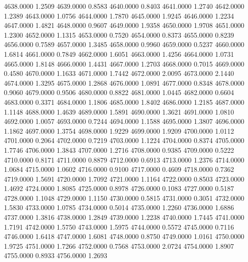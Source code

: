 4638.0000      1.2509
4639.0000      0.8583
4640.0000      0.8403
4641.0000      1.2740
4642.0000      1.2389
4643.0000      1.0756
4644.0000      1.7870
4645.0000      1.9245
4646.0000      1.2234
4647.0000      1.4821
4648.0000      0.9607
4649.0000      1.9358
4650.0000      1.9708
4651.0000      1.2300
4652.0000      1.1315
4653.0000      0.7520
4654.0000      0.8373
4655.0000      0.8239
4656.0000      0.7589
4657.0000      1.3485
4658.0000      0.9960
4659.0000      0.5237
4660.0000      1.6814
4661.0000      0.7849
4662.0000      1.6051
4663.0000      1.4256
4664.0000      1.0731
4665.0000      1.8148
4666.0000      1.4431
4667.0000      1.2703
4668.0000      0.7015
4669.0000      0.4580
4670.0000      1.1633
4671.0000      1.7442
4672.0000      2.0095
4673.0000      2.1440
4674.0000      1.3295
4675.0000      1.2868
4676.0000      1.0891
4677.0000      0.8348
4678.0000      0.9060
4679.0000      0.9506
4680.0000      0.8822
4681.0000      1.0445
4682.0000      0.6604
4683.0000      0.3371
4684.0000      1.1806
4685.0000      1.8402
4686.0000      1.2185
4687.0000      1.1148
4688.0000      1.4639
4689.0000      1.5891
4690.0000      1.3621
4691.0000      1.0810
4692.0000      1.0057
4693.0000      0.7244
4694.0000      1.1588
4695.0000      1.3807
4696.0000      1.1862
4697.0000      1.3754
4698.0000      1.9229
4699.0000      1.9209
4700.0000      1.0112
4701.0000      0.2064
4702.0000      0.7219
4703.0000      1.1224
4704.0000      0.8374
4705.0000      1.7746
4706.0000      1.3843
4707.0000      1.2716
4708.0000      0.9385
4709.0000      0.5222
4710.0000      0.8171
4711.0000      0.8879
4712.0000      0.6913
4713.0000      1.2376
4714.0000      1.0684
4715.0000      1.0602
4716.0000      0.9100
4717.0000      0.4609
4718.0000      0.7362
4719.0000      1.5691
4720.0000      1.7092
4721.0000      1.1164
4722.0000      0.8503
4723.0000      1.4692
4724.0000      1.8085
4725.0000      0.8978
4726.0000      0.1083
4727.0000      0.5187
4728.0000      1.1048
4729.0000      1.1150
4730.0000      0.5815
4731.0000      0.3051
4732.0000      1.5830
4733.0000      1.0785
4734.0000      0.5014
4735.0000      1.2260
4736.0000      1.6886
4737.0000      1.3816
4738.0000      1.2849
4739.0000      1.2238
4740.0000      1.7445
4741.0000      1.7191
4742.0000      1.5750
4743.0000      1.5975
4744.0000      0.5572
4745.0000      0.7116
4746.0000      1.6418
4747.0000      1.6081
4748.0000      0.8750
4749.0000      1.0161
4750.0000      1.9725
4751.0000      1.7266
4752.0000      0.7568
4753.0000      2.0724
4754.0000      1.8907
4755.0000      0.8933
4756.0000      1.2693
